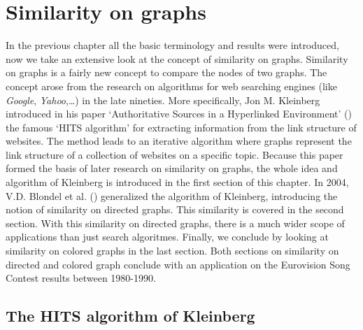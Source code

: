 \documentclass[a4paper,11pt]{report}
\begin{document}
\chapter{Similarity on graphs}

In the previous chapter all the basic terminology and results were introduced, 
now we take an extensive look at the concept of similarity on graphs. Similarity on graphs is a fairly new
concept to compare the nodes of two graphs. The concept arose from the research on algorithms for web searching engines (like \emph{Google}, \emph{Yahoo},\ldots) in the late nineties. 
More specifically, Jon M. Kleinberg 
introduced in his paper `Authoritative Sources in a Hyperlinked Environment' 
(\cite{kleinberg}) the famous `HITS algorithm' for extracting information from the link structure of websites. The method leads to an iterative algorithm where 
graphs represent the link structure of a collection of websites on a specific topic. Because this paper formed the basis of later research on similarity on graphs, 
the
whole idea and algorithm of Kleinberg is introduced in the first section of this chapter. In 
2004, V.D. Blondel et al. (\cite{blondel}) generalized the algorithm of 
Kleinberg, introducing the notion of similarity on directed graphs. This similarity is covered in the second section. With this similarity on directed graphs, 
there is a much wider scope of applications than just search algoritmes. 
Finally, we 
conclude by looking at similarity on colored graphs in the last section. Both sections on similarity on directed and colored graph conclude with an 
application on the Eurovision Song Contest results between 1980-1990. 
\section{The HITS algorithm of Kleinberg}
\end{document}
